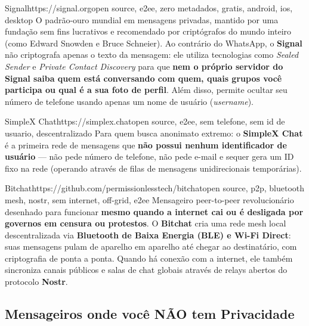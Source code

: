 \documentclass{pousadaguide}
\begin{document}
\begin{ferramenta}[recomendado,logo=signal]{Signal}{https://signal.org}{open source, e2ee, zero metadados, gratis, android, ios, desktop}
O padrão-ouro mundial em mensagens privadas, mantido por uma fundação sem fins lucrativos e recomendado por criptógrafos do mundo inteiro (como Edward Snowden e Bruce Schneier). Ao contrário do WhatsApp, o \textbf{Signal} não criptografa apenas o texto da mensagem: ele utiliza tecnologias como \emph{Sealed Sender} e \emph{Private Contact Discovery} para que \textbf{nem o próprio servidor do Signal saiba quem está conversando com quem, quais grupos você participa ou qual é a sua foto de perfil}. Além disso, permite ocultar seu número de telefone usando apenas um nome de usuário (\emph{username}). 
\end{ferramenta}

\begin{ferramenta}[goat,logo=simplex]{SimpleX Chat}{https://simplex.chat}{open source, e2ee, sem telefone, sem id de usuario, descentralizado}
Para quem busca anonimato extremo: o \textbf{SimpleX Chat} é a primeira rede de mensagens que \textbf{não possui nenhum identificador de usuário} — não pede número de telefone, não pede e-mail e sequer gera um ID fixo na rede (operando através de filas de mensagens unidirecionais temporárias). 
\end{ferramenta}

\begin{ferramenta}[recomendado,logo=bitchat]{Bitchat}{https://github.com/permissionlesstech/bitchat}{open source, p2p, bluetooth mesh, nostr, sem internet, off-grid, e2ee}
Mensageiro peer-to-peer revolucionário desenhado para funcionar \textbf{mesmo quando a internet cai ou é desligada por governos em censura ou protestos}. O \textbf{Bitchat} cria uma rede mesh local descentralizada via \textbf{Bluetooth de Baixa Energia (BLE) e Wi-Fi Direct}: suas mensagens pulam de aparelho em aparelho até chegar ao destinatário, com criptografia de ponta a ponta. Quando há conexão com a internet, ele também sincroniza canais públicos e salas de chat globais através de relays abertos do protocolo \textbf{Nostr}. 
\end{ferramenta}

\subsection{Mensageiros onde você NÃO tem Privacidade}
\end{document}
